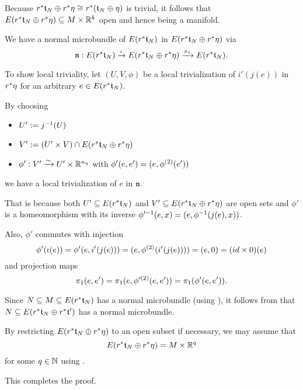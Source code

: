 \begin{scope}
\begin{myproof}
\begin{enumerate}
            Because $r^*\mathfrak{t}_N \oplus{} r^*\eta \cong r^*(\mathfrak{t}_N \oplus{} \eta)$ is trivial,
            it follows that $E(r^*\mathfrak{t}_N \oplus{} r^*\eta) \subseteq{} M \times \mathbb{R}^k$ open and hence being a manifold.

            We have a normal microbundle of $E(r^*\mathfrak{t}_N)$ in $E(r^*\mathfrak{t}_N \oplus{} r^*\eta)$ via
            \[ \mathfrak{n}: E(r^*\mathfrak{t}_N) \xrightarrow{\iota} E(r^*\mathfrak{t}_N \oplus{} r^*\eta) \xrightarrow{\pi_1} E(r^*\mathfrak{t}_N){}. \]

            To show local triviality,
            let $(U, V, \phi)$ be a local trivialization of $i'(j(e))$ in $r^*\eta$
            for an arbitrary $e \in E(r^*\mathfrak{t}_N)$.

            By choosing
            \begin{itemize}
                \item $U' := j^{-1}(U)$
                \item $V' := (U' \times V) \cap E(r^*\mathfrak{t}_N \oplus{} r^*\eta)$
                \item $\phi': V' \xrightarrow{\sim} U' \times \mathbb{R}^{n_\eta}$ with $\phi'(e, e') = (e, \phi^{(2)}(e'))$
            \end{itemize}
            we have a local trivialization of $e$ in $\mathfrak{n}$.

            That is because both $U' \subseteq{} E(r^*\mathfrak{t}_N)$ and $V' \subseteq{} E(r^*\mathfrak{t}_N \oplus{} r^*\eta)$ are open sets
            and $\phi'$ is a homeomorphism with its inverse
            $\phi'^{-1}(e, x) = (e, \phi^{-1}(j(e), x))$.
            
            Also, $\phi'$ commutes with injection
            \[ \phi'(\iota(e)) = \phi'(e, i'(j(e))) = (e, \phi^{(2)}(i'(j(e)))) = (e, 0) = (id \times 0)(e) \]
            and projection maps
            \[ \pi_1(e, e') = \pi_1(e, \phi'^{(2)}(e, e')) = \pi_1(\phi'(e, e')). \]
        \end{enumerate}
        Since $N \subseteq{} M \subseteq{} E(r^*\mathfrak{t}_N)$ has a normal microbundle (using ),
        it follows from  that
        $N \subseteq{} E(r^*\mathfrak{t}_N \oplus{} r^*\mathfrak{t}')$ has a normal microbundle.

        By restricting $E(r^*\mathfrak{t}_N \oplus{} r^*\eta)$ to an open subset if necessary, we may assume that
         \[ E(r^*\mathfrak{t}_N \oplus{} r^*\eta) = M \times \mathbb{R}^q \]
        for some $q \in \mathbb{N}$ using .

        This completes the proof.
    \end{myproof}

    \begin{myparagraph}
        
    \end{myparagraph}
\end{scope}